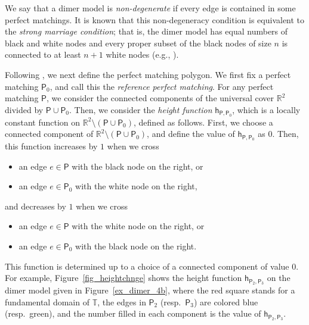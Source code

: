 \documentclass[pdftex]{sigma}%
\numberwithin{equation}{section}
\numberwithin{figure}{section}
\numberwithin{table}{section}
\newcommand{\RR}{\mathbb{R}}
\newcommand{\TT}{\mathbb{T}}
\newcommand{\sfh}{\mathsf{h}}
\newcommand{\sfP}{\mathsf{P}}
\begin{document}
We say that a dimer model is \emph{non-degenerate} if every edge is contained in some perfect matchings.
It is known that this non-degeneracy condition is equivalent to the \emph{strong marriage condition}; that is, the dimer model has equal numbers of black and white nodes and every proper subset of the black nodes of size $n$ is connected to at least $n+1$ white nodes (e.g., \cite[Remark~2.12]{Bro}).

Following \cite[Section~5]{IU2}, we next define the perfect matching polygon.
We first fix a perfect matching $\sfP_0$, and call this the \emph{reference perfect matching}.
For any perfect matching $\sfP$, we consider the connected components of the universal cover $\RR^2$ divided by $\sfP\cup\sfP_0$.
Then, we consider the \emph{height function} $\sfh_{\sfP,\sfP_0}$, which is a locally constant function on $\RR^2{\setminus}(\sfP\cup\sfP_0)$, defined as follows.
First, we choose a connected component of $\RR^2{\setminus}(\sfP\cup\sfP_0)$, and define the value of $\sfh_{\sfP,\sfP_0}$ as $0$.
Then, this function increases by $1$ when we cross
\begin{itemize}\itemsep=0pt
\item[--] an edge $e\in\sfP$ with the black node on the right, or
\item[--] an edge $e\in\sfP_0$ with the white node on the right,
\end{itemize}
and decreases by $1$
when we cross
\begin{itemize}\itemsep=0pt
\item[--] an edge $e\in\sfP$ with the white node on the right, or
\item[--] an edge $e\in\sfP_0$ with the black node on the right.
\end{itemize}
This function is determined up to a choice of a connected component of value $0$.
For example, Figure~\ref{fig_heightchnge} shows the height function $\sfh_{\sfP_2,\sfP_3}$ on the dimer model given in Figure~\ref{ex_dimer_4b},
where the red square stands for a fundamental domain of $\TT$, the edges in $\sfP_2$ (resp.~$\sfP_3$) are colored blue (resp.\ green),
and the number filled in each component is the value of $\sfh_{\sfP_2,\sfP_3}$.
\end{document}
